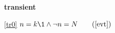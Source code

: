 \textbf{transient}
\begin{block}
\item[ \eqref{tr0} ]{$n = k \1\land \neg n = N  \qquad \text{(\ref{evt}$$)}$} %
\end{block}
